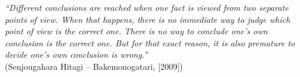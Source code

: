 \begin{epigrafe}
    \vspace*{\fill}
{%
    \noindent\hspace{.5\textwidth}
    {\begin{minipage}{.5\textwidth}
        \textit{``Different conclusions are reached when one fact is viewed from two separate points of view. When that happens, there is no immediate way to judge which point of view is the correct one. There is no way to conclude one’s own conclusion is the correct one. But for that exact reason, it is also premature to decide one’s own conclusion is wrong.''}\\(Senjougahara Hitagi {--} Bakemonogatari, [2009])
    \end{minipage}}%
    \vspace*{3cm}
}%
\end{epigrafe}
